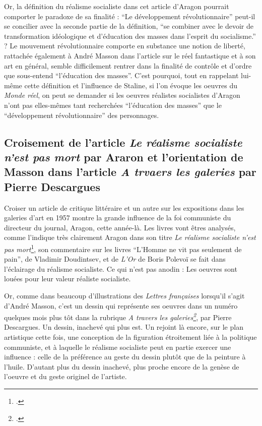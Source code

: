 Or, la définition du réalisme socialiste dans cet article d’Aragon pourrait comporter le paradoxe de sa finalité : \enquote{Le développement révolutionnaire} peut-il se concilier avec la seconde partie de la définition, \enquote{se combiner avec le devoir de transformation idéologique et d’éducation des masses dans l’esprit du socialisme.} ? Le mouvement révolutionnaire comporte en substance une notion de liberté, rattachée également à André Masson dans l’article sur le réel fantastique et à son art en général, semble difficilement rentrer dans la finalité de contrôle et d’ordre que sous-entend \enquote{l’éducation des masses}. C’est pourquoi, tout en rappelant lui-même cette définition et l’influence de Staline, si l’on évoque les oeuvres du \emph{Monde réel}, on peut se demander si les oeuvres réalistes socialistes d’Aragon n’ont pas elles-mêmes tant recherchées \enquote{l’éducation des masses} que le \enquote{développement révolutionnaire} des personnages. 

\subsection{Croisement de l'article \emph{Le réalisme socialiste n'est pas mort} par Araron et l'orientation de Masson dans l'article \emph{A trvaers les galeries} par Pierre Descargues}

	Croiser un article de critique littéraire et un autre sur les expositions dans les galeries d’art en 1957 montre la grande influence de la foi communiste du directeur du journal, Aragon, cette année-là. Les livres vont êtres analysés, comme l’indique très clairement Aragon dans son titre \emph{Le réalisme socialiste n’est pas mort}\footcite{realsoc}, son commentaire sur les livres \enquote{L’Homme ne vit pas seulement de pain}, de Vladimir Doudintsev, et de \emph{L’Or} de Boris Polevoï se fait dans l’éclairage du réalisme socialiste. Ce qui n’est pas anodin : Les oeuvres sont louées pour leur valeur réaliste socialiste. 


	Or, comme dans beaucoup d’illustrations des \emph{Lettres françaises }lorsqu’il s’agit d’André Masson, c’est un dessin qui représente ses oeuvres dans un numéro quelques mois plus tôt dans la rubrique \emph{A travers les galeries\footcite{atraversgaleries}}, par Pierre Descargues. Un dessin, inachevé qui plus est. Un rejoint là encore, sur le plan artistique cette fois, une conception de la figuration étroitement liée à la politique communiste, et à laquelle le réalisme socialiste peut en partie exercer une influence : celle de la préférence au geste du dessin plutôt que de la peinture à l’huile. D’autant plus du dessin inachevé, plus proche encore de la genèse de l’oeuvre et du geste originel de l’artiste. 

